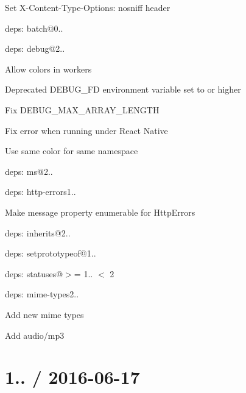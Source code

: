 
\begin{DoxyItemize}
\item Set {\ttfamily X-\/\+Content-\/\+Type-\/\+Options\+: nosniff} header
\item deps\+: batch@0..
\item deps\+: debug@2..
\begin{DoxyItemize}
\item Allow colors in workers
\item Deprecated {\ttfamily D\+E\+B\+U\+G\+\_\+\+FD} environment variable set to {} or higher
\item Fix {\ttfamily D\+E\+B\+U\+G\+\_\+\+M\+A\+X\+\_\+\+A\+R\+R\+A\+Y\+\_\+\+L\+E\+N\+G\+TH}
\item Fix error when running under React Native
\item Use same color for same namespace
\item deps\+: ms@2..
\end{DoxyItemize}
\item deps\+: http-\/errors1..
\begin{DoxyItemize}
\item Make {\ttfamily message} property enumerable for {\ttfamily Http\+Error}s
\item deps\+: inherits@2..
\item deps\+: setprototypeof@1..
\item deps\+: statuses@\textquotesingle{}$>$= 1.. $<$ 2\textquotesingle{}
\end{DoxyItemize}
\item deps\+: mime-\/types2..
\begin{DoxyItemize}
\item Add new mime types
\item Add {\ttfamily audio/mp3}
\end{DoxyItemize}
\end{DoxyItemize}

\section*{1.. / 2016-\/06-\/17 }


